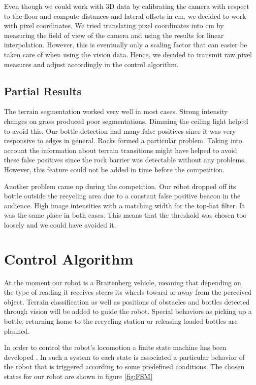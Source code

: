 Even though we could work with 3D data by calibrating the camera with respect to the
floor and compute distances and lateral offsets in cm, we decided to work with pixel
coordinates. We tried translating pixel coordinates into cm by measuring the field of view
of the camera and using the results for linear interpolation. However, this is eventually
only a scaling factor that can easier be taken care of when using the vision data. Hence,
we decided to transmit raw pixel measures and adjust accordingly in the control algorithm.

\subsection{Partial Results}
The terrain segmentation worked very well in most cases. Strong intensity changes on grass
produced poor segmentations. Dimming the ceiling light helped to avoid this. 
Our bottle detection had many false positives since it was very responsive to edges in
general. Rocks formed a particular problem. Taking into account the information
about terrain transitions might have helped to avoid these false positives since the 
rock barrier was detectable without any problems. However, this feature could not 
be added in time before the competition. 

Another problem came up during the competition. Our robot dropped off its bottle 
outside the recycling area due to a constant false positive beacon in the audience. 
High image intensities with a matching width for the top-hat filter.
It was the same place in both cases.
This means that the threshold was chosen too loosely and we could have avoided it.

\section{Control Algorithm}
At the moment our robot is a Braitenberg vehicle, meaning that depending on the type
of reading it receives steers its wheels toward or away from the perceived object.
Terrain classification as well as positions of obstacles and bottles detected through
vision will be added to guide the robot. Special behaviors as picking up a bottle,
returning home to the recycling station or releasing loaded bottles are planned.

In order to control the robot's locomotion a finite state machine has been developed .
In such a system to each state is associated a particular behavior of the robot that is triggered according to some predefined conditions.
The chosen states for our robot are shown in figure \ref{fig:FSM}

